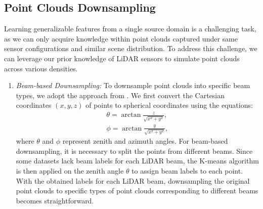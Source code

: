 \label{method}

\subsection{Point Clouds Downsampling} 
Learning generalizable features from a single source domain is a challenging task, as we can only acquire knowledge within point clouds captured under same sensor configurations and similar scene distribution. To address this challenge, we can leverage our prior knowledge of LiDAR sensors to simulate point clouds across various densities.
\begin{enumerate}[label=\emph{\arabic*)}, wide]
    \item \emph{Beam-based Downsampling:} To downsample point clouds into specific beam types, we adopt the approach from \cite{wei2022lidar}. We first convert the Cartesian coordinates $(x, y, z)$ of points to spherical coordinates using the equations:
    \begin{equation}
        \begin{split}
        \theta = \arctan \frac{z}{\sqrt{x^2 + y^2}},\\
        \phi = \arctan \frac{y}{\sqrt{x^2 + y^2}},
        \end{split}
        \label{coord_trans}
    \end{equation}
    where $\theta$ and $\phi$ represent zenith and azimuth angles. For beam-based downsampling, it is necessary to split the points from different beams. Since some datasets lack beam labels for each LiDAR beam, the K-means algorithm is then applied on the zenith angle $\theta$ to assign beam labels to each point. With the obtained labels for each LiDAR beam, downsampling the original point clouds to specific types of point clouds corresponding to different beams becomes straightforward.
    

\end{enumerate}
